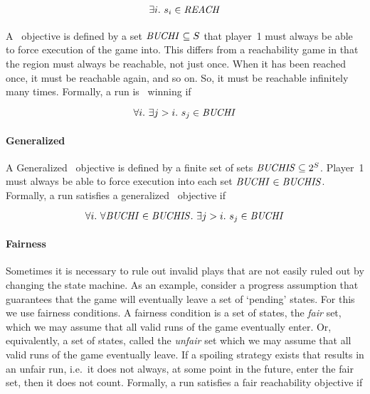 \begin{equation}
\label{eqn:reachobj}
\exists i.\ s_i \in \mathit{REACH}
\end{equation}

\paragraph{\buchi}
A \buchi\ objective is defined by a set $\mathit{BUCHI} \subseteq S$ that player~1 must always be able to force execution of the game into. This differs from a reachability game in that the region must always be reachable, not just once. When it has been reached once, it must be reachable again, and so on. So, it must be reachable infinitely many times. Formally, a run is \buchi\ winning if 

\begin{equation}
\forall i.\ \exists j>i.\ s_j \in \mathit{BUCHI}
\end{equation}

\paragraph{Generalized \buchi}
A Generalized \buchi\ objective is defined by a finite set of sets $\mathit{BUCHIS} \subseteq 2^S$. Player~1 must always be able to force execution into each set $\mathit{BUCHI} \in \mathit{BUCHIS}$. Formally, a run satisfies a generalized \buchi\ objective if 

\begin{equation}
\forall i.\ \forall \mathit{BUCHI} \in \mathit{BUCHIS}.\ \exists j>i.\ s_j \in \mathit{BUCHI}
\end{equation}

\paragraph{Fairness}
Sometimes it is necessary to rule out invalid plays that are not easily ruled out by changing the state machine. As an example, consider a progress assumption that guarantees that the game will eventually leave a set of `pending' states. For this we use fairness conditions. A fairness condition is a set of states, the \emph{fair} set, which we may assume that all valid runs of the game eventually enter. Or, equivalently, a set of states, called the \emph{unfair} set which we may assume that all valid runs of the game eventually leave. If a spoiling strategy exists that results in an unfair run, i.e.\ it does not always, at some point in the future, enter the fair set, then it does not count. Formally, a run satisfies a fair reachability objective if 

